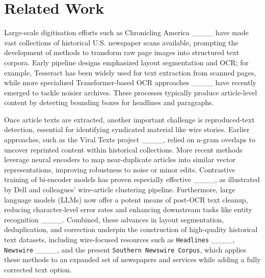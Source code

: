 \section{Related Work}
\label{sec:related}

Large-scale digitisation efforts such as Chronicling America ____ have made vast collections of historical U.S. newspaper scans available, prompting the development of methods to transform raw page images into structured text corpora. Early pipeline designs emphasized layout segmentation and OCR; for example, Tesseract has been widely used for text extraction from scanned pages, while more specialized Transformer-based OCR approaches ____ have recently emerged to tackle noisier archives. These processes typically produce article-level content by detecting bounding boxes for headlines and paragraphs.

Once article texts are extracted, another important challenge is reproduced-text detection, essential for identifying syndicated material like wire stories. Earlier approaches, such as the Viral Texts project ____, relied on n-gram overlaps to uncover reprinted content within historical collections. More recent methods leverage neural encoders to map near-duplicate articles into similar vector representations, improving robustness to noise or minor edits. Contrastive training of bi-encoder models has proven especially effective ____, as illustrated by Dell and colleagues’ wire-article clustering pipeline. Furthermore, large language models (LLMs) now offer a potent means of post-OCR text cleanup, reducing character-level error rates and enhancing downstream tasks like entity recognition ____. Combined, these advances in layout segmentation, deduplication, and correction underpin the construction of high-quality historical text datasets, including wire-focused resources such as \texttt{Headlines} ____, \texttt{Newswire} ____, and the present \texttt{Southern Newswire Corpus}, which applies these methods to an expanded set of newspapers and services while adding a fully corrected text option.